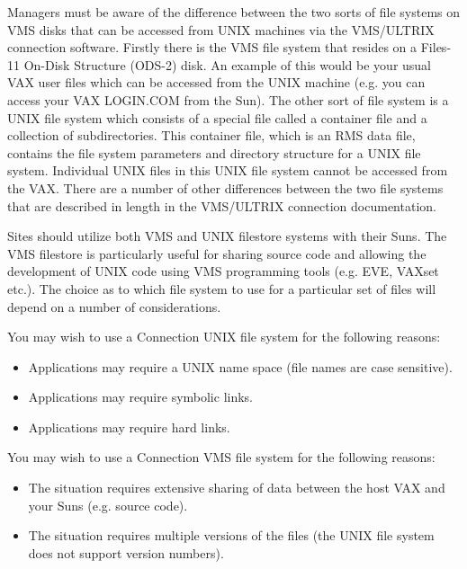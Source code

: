 Managers must be aware of the difference between the two sorts of file
systems on VMS disks that can be accessed from UNIX machines via the 
VMS/ULTRIX connection software. Firstly there is the VMS file system that
resides on a Files-11 On-Disk Structure (ODS-2) disk. An example of this
would be your usual VAX user files which can be accessed from the UNIX
machine (e.g. you can access your VAX LOGIN.COM from the Sun). The other sort
of file system is a UNIX file system which consists of a special
file called a container file and a collection of subdirectories. This container
file, which is an RMS data file, contains the file system parameters and
directory structure for a UNIX file system. Individual UNIX files in this UNIX
file system cannot be accessed from the VAX. There are a number of other
differences between the two file systems that are described in length in the
VMS/ULTRIX connection  documentation. 

Sites should utilize both VMS and UNIX filestore systems with their Suns.
The VMS filestore is particularly useful for sharing source code and 
allowing the development of UNIX code using VMS programming tools
(e.g. EVE, VAXset etc.). The choice as to which file system to use for
a particular set of files will depend on a number of considerations.

You may wish to use a Connection UNIX file system for the following reasons:

\begin{itemize}

\item Applications may require a UNIX name space (file names are case
sensitive).

\item Applications may require symbolic links.

\item Applications may require hard links.

\end{itemize}

You may wish to use a Connection VMS file system for the following reasons:

\begin{itemize}

\item The situation requires extensive sharing of data between the host VAX and 
your Suns (e.g. source code).

\item The situation requires multiple versions of the files (the UNIX file system
does not support version numbers).

\end{itemize}

